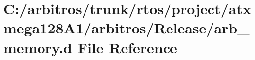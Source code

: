 \hypertarget{rtos_2project_2atxmega128_a1_2arbitros_2_release_2arb__memory_8d}{\section{C\-:/arbitros/trunk/rtos/project/atxmega128\-A1/arbitros/\-Release/arb\-\_\-memory.d File Reference}
\label{rtos_2project_2atxmega128_a1_2arbitros_2_release_2arb__memory_8d}
}
